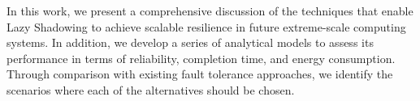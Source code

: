 In this work, we present a comprehensive discussion of the techniques that enable Lazy Shadowing to achieve scalable resilience in future extreme-scale computing systems. In addition, we develop a series of analytical models to assess its performance in terms of reliability, completion time, and energy consumption. 
Through comparison with existing fault tolerance approaches, we identify the scenarios where each of the alternatives should be chosen.










